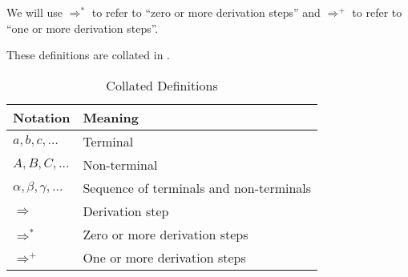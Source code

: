

We will use $\Rightarrow^{*}$ to refer to ``zero or more derivation steps'' and $\Rightarrow^{+}$ to refer to ``one or more derivation steps''.

These definitions are collated in .

\begin{table}[]
    \centering
    \begin{tabular}{l|l}
        \textbf{Notation} & \textbf{Meaning} \\ \hline
        $a, b, c, \ldots$ & Terminal \\
        $A, B, C, \ldots$ & Non-terminal \\
        $\alpha, \beta, \gamma, \ldots$ & Sequence of terminals and non-terminals \\
        $\Rightarrow$ & Derivation step\\
        $\Rightarrow^{*}$ & Zero or more derivation steps\\
        $\Rightarrow^{+}$ & One or more derivation steps
    \end{tabular}
    \caption{Collated Definitions}
    \label{tab:par-collated-notation}
\end{table}



